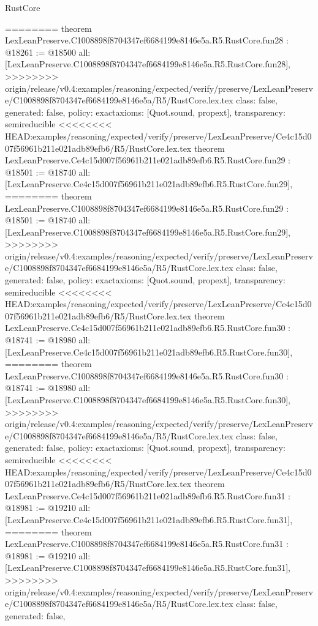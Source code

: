 \begin{lexlean}{RustCore}
\begin{coremodule}
{\begin{coremodule}
{{{{{{{{{{{{{{{{{{{{{{{{{{{{{{{========
theorem LexLeanPreserve.C1008898f8704347ef6684199e8146e5a.R5.RustCore.fun28 : @18261 := @18500 {
  all: [LexLeanPreserve.C1008898f8704347ef6684199e8146e5a.R5.RustCore.fun28],
>>>>>>>> origin/release/v0.4:examples/reasoning/expected/verify/preserve/LexLeanPreserve/C1008898f8704347ef6684199e8146e5a/R5/RustCore.lex.tex
  class: false,
  generated: false,
  policy: exact{axioms: [Quot.sound, propext]},
  transparency: semireducible
}
<<<<<<<< HEAD:examples/reasoning/expected/verify/preserve/LexLeanPreserve/Ce4c15d007f56961b211e021adb89efb6/R5/RustCore.lex.tex
theorem LexLeanPreserve.Ce4c15d007f56961b211e021adb89efb6.R5.RustCore.fun29 : @18501 := @18740 {
  all: [LexLeanPreserve.Ce4c15d007f56961b211e021adb89efb6.R5.RustCore.fun29],
========
theorem LexLeanPreserve.C1008898f8704347ef6684199e8146e5a.R5.RustCore.fun29 : @18501 := @18740 {
  all: [LexLeanPreserve.C1008898f8704347ef6684199e8146e5a.R5.RustCore.fun29],
>>>>>>>> origin/release/v0.4:examples/reasoning/expected/verify/preserve/LexLeanPreserve/C1008898f8704347ef6684199e8146e5a/R5/RustCore.lex.tex
  class: false,
  generated: false,
  policy: exact{axioms: [Quot.sound, propext]},
  transparency: semireducible
}
<<<<<<<< HEAD:examples/reasoning/expected/verify/preserve/LexLeanPreserve/Ce4c15d007f56961b211e021adb89efb6/R5/RustCore.lex.tex
theorem LexLeanPreserve.Ce4c15d007f56961b211e021adb89efb6.R5.RustCore.fun30 : @18741 := @18980 {
  all: [LexLeanPreserve.Ce4c15d007f56961b211e021adb89efb6.R5.RustCore.fun30],
========
theorem LexLeanPreserve.C1008898f8704347ef6684199e8146e5a.R5.RustCore.fun30 : @18741 := @18980 {
  all: [LexLeanPreserve.C1008898f8704347ef6684199e8146e5a.R5.RustCore.fun30],
>>>>>>>> origin/release/v0.4:examples/reasoning/expected/verify/preserve/LexLeanPreserve/C1008898f8704347ef6684199e8146e5a/R5/RustCore.lex.tex
  class: false,
  generated: false,
  policy: exact{axioms: [Quot.sound, propext]},
  transparency: semireducible
}
<<<<<<<< HEAD:examples/reasoning/expected/verify/preserve/LexLeanPreserve/Ce4c15d007f56961b211e021adb89efb6/R5/RustCore.lex.tex
theorem LexLeanPreserve.Ce4c15d007f56961b211e021adb89efb6.R5.RustCore.fun31 : @18981 := @19210 {
  all: [LexLeanPreserve.Ce4c15d007f56961b211e021adb89efb6.R5.RustCore.fun31],
========
theorem LexLeanPreserve.C1008898f8704347ef6684199e8146e5a.R5.RustCore.fun31 : @18981 := @19210 {
  all: [LexLeanPreserve.C1008898f8704347ef6684199e8146e5a.R5.RustCore.fun31],
>>>>>>>> origin/release/v0.4:examples/reasoning/expected/verify/preserve/LexLeanPreserve/C1008898f8704347ef6684199e8146e5a/R5/RustCore.lex.tex
  class: false,
  generated: false,
}}}}}}}}}}}}}}}}}}}}}}}}}}}}}}}}}}}
\end{coremodule}}
\end{coremodule}
\end{lexlean}
